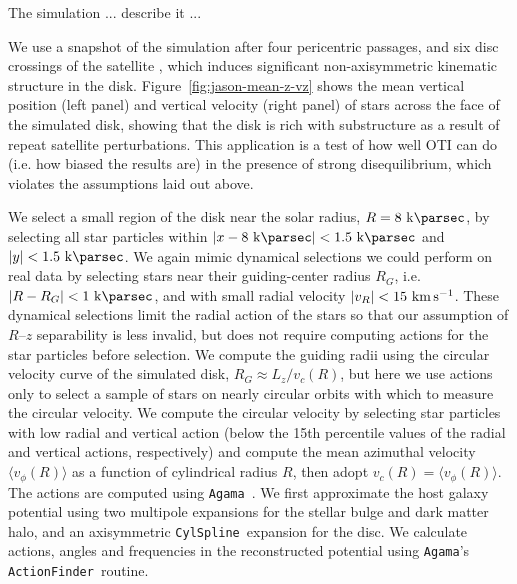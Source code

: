 The simulation ... describe it ...

We use a snapshot of the simulation after four pericentric passages, and six disc crossings of the
satellite \citep[see Figure 3 of][for the orbit and mass loss of the satellite]{Hunt:2021}, which induces significant non-axisymmetric kinematic structure in the disk.
Figure~\ref{fig:jason-mean-z-vz} shows the mean vertical position (left panel) and
vertical velocity (right panel) of stars across the face of the simulated disk, showing
that the disk is rich with substructure as a result of repeat satellite perturbations.
This application is a test of how well OTI can do (i.e. how biased the results are) in
the presence of strong disequilibrium, which violates the assumptions laid out above.

We select a small region of the disk near the solar radius, $R=8~\kpc$, by selecting all
star particles within $|x-8~\kpc| < 1.5~\kpc$ and $|y| < 1.5~\kpc$.
We again mimic dynamical selections we could perform on real data by selecting stars
near their guiding-center radius $R_G$, i.e. $|R-R_G| < 1~\kpc$, and with small radial
velocity $|v_R| < 15~\kms$.
These dynamical selections limit the radial action of the stars so that our assumption
of $R$--$z$ separability is less invalid, but does not require computing actions for the
star particles before selection.
We compute the guiding radii using the circular velocity curve of the simulated disk,
$R_G \approx L_z / v_c(R)$, but here we use actions only to select a sample of stars on
nearly circular orbits with which to measure the circular velocity.
We compute the circular velocity by selecting star particles with low radial and
vertical action (below the 15th percentile values of the radial and vertical actions,
respectively) and compute the mean azimuthal velocity $\langle v_\phi(R) \rangle$ as a
function of cylindrical radius $R$, then adopt $v_c(R) = \langle v_\phi(R) \rangle$.
The actions are computed using \texttt{Agama}\ \citep{Vasiliev:2019}. We first approximate the host galaxy potential using two multipole expansions for the stellar bulge and dark matter halo, and an axisymmetric \texttt{CylSpline}\ expansion for the disc. We calculate actions, angles and frequencies in the reconstructed potential using \texttt{Agama}'s \texttt{ActionFinder}\ routine.

